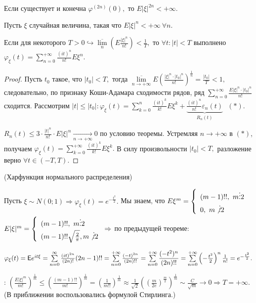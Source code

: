 	\begin{property}[б/д]
		Если существует и конечна $\varphi^{(2n)}(0),$ то $E|\xi|^{2n} < +\infty.$
	\end{property}
	\begin{theorem}
		Пусть $\xi$ случайная величина, такая что $E|\xi|^n < +\infty~ \forall n.$ 
		
		Если для некоторого $T > 0 \hookrightarrow \overline{\lim\limits_{n}}\left(E \frac{|\xi|^n}{n!}\right) < \frac{1}{T},$ то $\forall t: |t| < T$ выполнено $\varphi_\xi(t) = \sum\limits_{n = 0}^{+\infty} \frac{(it)^n}{n!}E\xi^n.$
		\begin{proof}
			Пусть $t_0$ такое, что $|t_0| < T, $ тогда $\overline{\lim\limits_{n \to +\infty}}E\left(\frac{|\xi|^n \cdot |t_0|^n}{n!}\right)^{\frac{1}{n}} = \frac{|t_0|}{T} < 1, $ следовательно, по признаку Коши-Адамара сходимости рядов, ряд $\sum\limits_{n = 0}^{+\infty} \frac{E|\xi|^n\cdot|t_0|^n}{n!}$ сходится.
			Рассмотрим $|t| \leqslant |t_0|: \varphi_\xi(t) = \sum\limits_{k = 0}^{n} \frac{(it)^k}{k!}E\xi^k + \underbrace{\frac{(it)^n}{n!}\varepsilon_n(t)}_{R_n(t)}~~~(*).$ 

			\noindent$R_n(t) \leqslant 3\cdot \frac{|t|^n}{n!}\cdot E|\xi|^n \underset{n \to +\infty}{\longrightarrow} 0$ по условию теоремы. Устремляя $n\to + \infty$ в $(*)$, получаем $\varphi_\xi(t) = \sum\limits_{k = 0}^{+\infty} \frac{(it)^k}{k!}E\xi^k.$ В силу произвольности $|t_0| < T,$ разложение верно $\forall t \in (-T, T).$
		\end{proof}
	\end{theorem}

	\begin{example} (Харфункция нормального распределения)
	
		Пусть $\xi \sim N(0;1) \Rightarrow \varphi_\xi(t) = e^{- \frac{t^2}{2}}.$ Мы знаем, что $E\xi^m = \left\{
			\begin{array}{l}
			(m-1)!!, ~m \vdots 2\\
			0, ~m\not \vdots 2
			\end{array}
		\right.$
		$E|\xi|^m = \left\{
			\begin{array}{l}
			(m - 1)!!, ~m \vdots 2\\
			(m - 1)!!\sqrt{\frac{2}{\pi}}, m \not \vdots 2
			\end{array}
		\right. \Rightarrow$ по предыдущей теореме:
		
		$\varphi_\xi(t) = \mathsf{E} e^{it\xi} = \sum\limits_{n = 0}^{\infty} \frac{(it)^{2n}}{(2n)!}(2n - 1)!! = \sum\limits_{n = 0}^{+\infty} \frac{(-t)^{2n}}{(2n)!!} = \sum\limits_{n = 0}^{+\infty} \dfrac{(- t^2)^n}{(2n)!!} = \sum\limits_{n = 0}^{+\infty} \left(- \frac{t^2}{2}\right)^n \frac{1}{n!} = e^{-\frac{t^2}{2}}.$

		\underline{}: $\left(\frac{E|\xi|^m}{m!}\right)^{\frac{1}{m}} \leqslant \left(\frac{(m - 1)!!}{m!}\right)^{\frac{1}{m}} = \left(\frac{1}{m!!}\right)^{\frac{1}{m}} \approx \frac{1}{\sqrt{2}}\left(\left(\frac{m}{2e}\right)^{\frac{m}{2}}\right)^{\frac{1}{m}} \sim \frac{C}{\sqrt{m}} \to 0 \Rightarrow T = + \infty.$ (В приближении воспользовались формулой Стирлинга.)
	\end{example}

